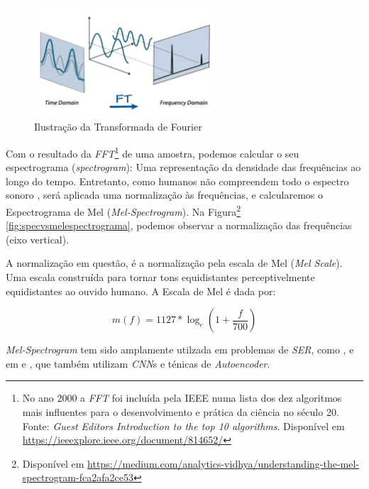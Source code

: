 \begin{figure}[!h]
\centering
\includegraphics[width=0.6\textwidth]{imagens/ft.png}
\caption{\label{fig:fouriertransform}Ilustração da Transformada de Fourier}
\end{figure}

Com o resultado da \textit{FFT}\footnote{No ano 2000 a \textit{FFT} foi incluída pela IEEE numa lista dos dez algoritmos mais influentes para o desenvolvimento e prática da ciência no século 20. Fonte: \textit{Guest Editors Introduction to the top 10 algorithms}. Disponível em \url{https://ieeexplore.ieee.org/document/814652/}} de uma amostra, podemos calcular o seu espectrograma (\textit{spectrogram}): Uma representação da densidade das frequências ao longo do tempo. Entretanto, como humanos não compreendem todo o espectro sonoro \cite{62}, será aplicada uma normalização às frequências, e calcularemos o Espectrograma de Mel (\textit{Mel-Spectrogram}). Na Figura\footnote{Disponível em \url{https://medium.com/analytics-vidhya/understanding-the-mel-spectrogram-fca2afa2ce53}} \ref{fig:specvsmelespectrograma}, podemos observar a normalização das frequências (eixo vertical).

A normalização em questão, é a normalização pela escala de Mel (\textit{Mel Scale}). Uma escala construída para tornar tons equidistantes perceptivelmente equidistantes ao ouvido humano. A Escala de Mel é dada por:

\begin{equation}
    m(f) = 1127 * \log_e{(1 + \frac{f}{700})}
\end{equation}

\textit{Mel-Spectrogram} tem sido amplamente utilzada em problemas de \textit{SER}, como \cite{32.25} \cite{32.30}, e em \cite{32.31} e \cite{32.32}, que também utilizam \textit{CNN}s e ténicas de \textit{Autoencoder}.

